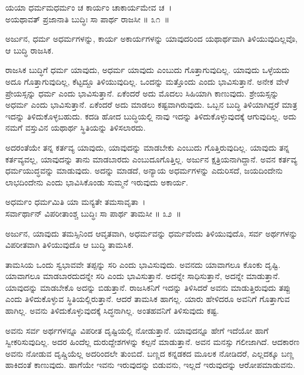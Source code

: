 \begin{shloka}
ಯಯಾ ಧರ್ಮಮಧರ್ಮಂ ಚ ಕಾರ್ಯಂ ಚಾಕಾರ್ಯಮೇವ ಚ~।\\ಅಯಥಾವತ್ ಪ್ರಜಾನಾತಿ ಬುದ್ಧಿಃ ಸಾ ಪಾರ್ಥ ರಾಜಸೀ \hfill॥ ೩೧~॥
\end{shloka}

\begin{artha}
ಅರ್ಜುನ, ಧರ್ಮ ಅಧರ್ಮಗಳನ್ನು, ಕಾರ್ಯ ಅಕಾರ್ಯಗಳನ್ನು ಯಾವುದರಿಂದ ಯಥಾರ್ಥವಾಗಿ ತಿಳಿಯುವುದಿಲ್ಲವೊ, ಆ ಬುದ್ಧಿ ರಾಜಸಿಕ.
\end{artha}

ರಾಜಸಿಕ ಬುದ್ಧಿಗೆ ಧರ್ಮ ಯಾವುದು, ಅಧರ್ಮ ಯಾವುದು ಎಂಬುದು ಗೊತ್ತಾಗುವುದಿಲ್ಲ. ಯಾವುದು ಒಳ್ಳೆಯದು ಅದೂ ಗೊತ್ತಾಗುವುದಿಲ್ಲ, ಕೆಟ್ಟದ್ದೂ ತಿಳಿಯುವುದಿಲ್ಲ. ಒಂದನ್ನು ಮತ್ತೊಂದು ಎಂದು ಭಾವಿಸುತ್ತಾನೆ. ಅನೇಕ ವೇಳೆ ಪ್ರೇಯಸ್ಸನ್ನು ಧರ್ಮ ಎಂದು ಭಾವಿಸುತ್ತಾನೆ. ಏಕೆಂದರೆ ಅದು ಮೊದಲು ಸಿಹಿಯಾಗಿ ಕಾಣುವುದು. ಶ್ರೇಯಸ್ಸನ್ನು ಅಧರ್ಮ ಎಂದು ಭಾವಿಸುತ್ತಾನೆ. ಏಕೆಂದರೆ ಅದು ಮಾಡಲು ಕಷ್ಟವಾಗಿರುವುದು. ಒಬ್ಬನ ಬುದ್ಧಿ ತಿಳಿಯಾಗಿದ್ದರೆ ಮಾತ್ರ ಇದನ್ನು ತಿಳಿದುಕೊಳ್ಳಬಹುದು. ಕದಡಿ ಹೋದ ಬುದ್ಧಿಯಲ್ಲಿ ನಾವು ಇದನ್ನು ತಿಳಿದುಕೊಳ್ಳುವುದಕ್ಕೆ ಆಗುವುದಿಲ್ಲ. ಅದು ನಮಗೆ ವಸ್ತುವಿನ ಯಥಾರ್ಥ ಸ್ಥಿತಿಯನ್ನು ತಿಳಿಸಲಾರದು.

ಅದರಂತೆಯೇ ತನ್ನ ಕರ್ತವ್ಯ ಯಾವುದು, ಯಾವುದನ್ನು ಮಾಡಬೇಕು ಎಂಬುದು ಗೊತ್ತಿರುವುದಿಲ್ಲ. ಯಾವುದು ತನ್ನ ಕರ್ತವ್ಯವಲ್ಲ, ಯಾವುದನ್ನು ತಾನು ಮಾಡಬಾರದು ಎಂಬುದೂ\break ಗೊತ್ತಿಲ್ಲ. ಅರ್ಜುನ ಕ್ಷತ್ರಿಯನಾಗಿದ್ದಾನೆ. ಅವನ ಕರ್ತವ್ಯ ಧರ್ಮಯುದ್ಧವನ್ನು ಮಾಡುವುದು. ಅದನ್ನು ಮಾಡದೆ, ಅನ್ಯಾಯ ಅಧರ್ಮಗಳನ್ನು ಎದುರಿಸದೆ, ಜಯದಿಂದೇನು ಲಾಭದಿಂದೇನು ಎಂದು ಭಾವಿಸಿಕೊಂಡು ಸುಮ್ಮನೆ ಇರುವುದು ಅಕಾರ್ಯ.

\begin{shloka}
ಅಧರ್ಮಂ ಧರ್ಮಮಿತಿ ಯಾ ಮನ್ಯತೇ ತಮಸಾವೃತಾ~।\\ಸರ್ವಾರ್ಥಾನ್ ವಿಪರೀತಾಂಶ್ಚ ಬುದ್ಧಿಃ ಸಾ ಪಾರ್ಥ ತಾಮಸೀ \hfill॥ ೩೨~॥
\end{shloka}

\begin{artha}
ಅರ್ಜುನ, ಯಾವುದು ತಮಸ್ಸಿನಿಂದ ಆವೃತವಾಗಿ, ಅಧರ್ಮವನ್ನು ಧರ್ಮವೆಂದು ತಿಳಿಯುವುದೊ, ಸರ್ವ ಅರ್ಥಗಳನ್ನು ವಿಪರೀತವಾಗಿ ತಿಳಿಯುವುದೊ ಆ ಬುದ್ಧಿ ತಾಮಸಿಕ.
\end{artha}

ತಾಮಸಿಯ ಒಂದು ಸ್ವಭಾವವೇ ತಪ್ಪನ್ನು ಸರಿ ಎಂದು ಭಾವಿಸುವುದು. ಅವನದು ಯಾವಾಗಲೂ ಕೊಂಕು ದೃಷ್ಟಿ. ಯಾವಾಗಲೂ ಮಾಡಬಾರದುದನ್ನೇ ಸರಿ ಎಂದು ಭಾವಿಸುತ್ತಾನೆ. ಅದನ್ನೇ ಸಾಧಿಸುತ್ತಾನೆ, ಅದನ್ನೇ ಮಾಡುತ್ತಾನೆ. ಯಾವುದನ್ನು ಮಾಡಬೇಕೊ ಅದನ್ನು ಬಿಡುತ್ತಾನೆ. ರಾಜಸಿಕನಿಗೆ ಇದನ್ನು ತಿಳಿಸಿದರೆ ಅವನು ಮಾಡುತ್ತಿರುವುದು ತಪ್ಪು ಎಂದು ತಿಳಿದುಕೊಳ್ಳುವ ಸ್ಥಿತಿಯಲ್ಲಿರುತ್ತಾನೆ. ಆದರೆ ತಾಮಸಿಕ ಹಾಗಲ್ಲ. ಯಾರು ಹೇಳಿದರೂ ಅವನಿಗೆ ಗೊತ್ತಾಗುವ ಹಾಗಿಲ್ಲ. ಅವನು ತಿಳಿದುಕೊಳ್ಳುವುದಕ್ಕೆ ಸಿದ್ಧನಾಗಿಲ್ಲ. ಅಂತಹವನಿಗೆ ತಿಳಿಸುವುದು ಕಷ್ಟ.

ಅವನು ಸರ್ವ ಅರ್ಥಗಳನ್ನೂ ವಿಪರೀತ ದೃಷ್ಟಿಯಲ್ಲಿ ನೋಡುತ್ತಾನೆ. ಯಾವುದನ್ನೂ ಹೇಗೆ ಇದೆಯೋ ಹಾಗೆ ಸ್ವೀಕರಿಸುವುದಿಲ್ಲ. ಅದರ ಹಿಂದೆಲ್ಲ ದುರುದ್ದೇಶಗಳನ್ನು ಕಲ್ಪನೆ ಮಾಡುತ್ತಾನೆ. ಅವನ ಮನಸ್ಸು ಗಲೀಜಾಗಿದೆ. ಆದಕಾರಣ ಅವನು ನೋಡುವ ದೃಷ್ಚಿಯೆಲ್ಲ ಅದರಿಂದಲೇ ತುಂಬಿದೆ. ಬಣ್ಣದ ಕನ್ನಡಕದ ಮೂಲಕ ನೋಡಿದರೆ, ಎಲ್ಲದಕ್ಕೂ ಬಣ್ಣ ಹಾಕಿದಂತೆ ಕಾಣುವುದು. ಹಾಗೆಯೇ ಇವನು ಇರುವುದನ್ನು ಬಿಡುವನು, ಇಲ್ಲದೆ ಇರುವುದನ್ನು ಆರೋಪಮಾಡುವನು.

